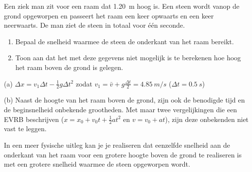 

Een ziek man zit voor een raam dat \SI{1,20}{m} hoog is. Een steen wordt vanop de grond opgeworpen en passeert het raam een keer opwaarts en een keer neerwaarts. De man ziet de steen in totaal voor \'e\'en seconde.%
\begin{enumerate}
\item Bepaal de snelheid waarmee de steen de onderkant van het raam bereikt.%
\item Toon aan dat het met deze gegevens niet mogelijk is te berekenen hoe hoog het raam boven de grond is gelegen.
\end{enumerate}

\begin{oplossing}
	(a) $\Delta x= v_1\Delta t-\frac{1}{2}g\Delta t^2$ zodat $v_1=\bar{v}+g\frac{\Delta t}{2}=\SI{4,85}{m/s}$ ($\Delta t = \SI{0,5}{s}$)
	
	(b) Naast de hoogte van het raam boven de grond, zijn ook de benodigde tijd en de beginsnelheid onbekende grootheden. Met maar twee vergelijkingen die een EVRB beschrijven ($x=x_0+v_0t+\frac{1}{2}at^2$ en $v=v_0+at$), zijn deze onbekenden niet vast te leggen. 
	
	In een meer fysische uitleg kan je je realiseren dat eenzelfde snelheid aan de onderkant van het raam voor een grotere hoogte boven de grond te realiseren is met een grotere snelheid waarmee de steen opgeworpen wordt.
\end{oplossing}



